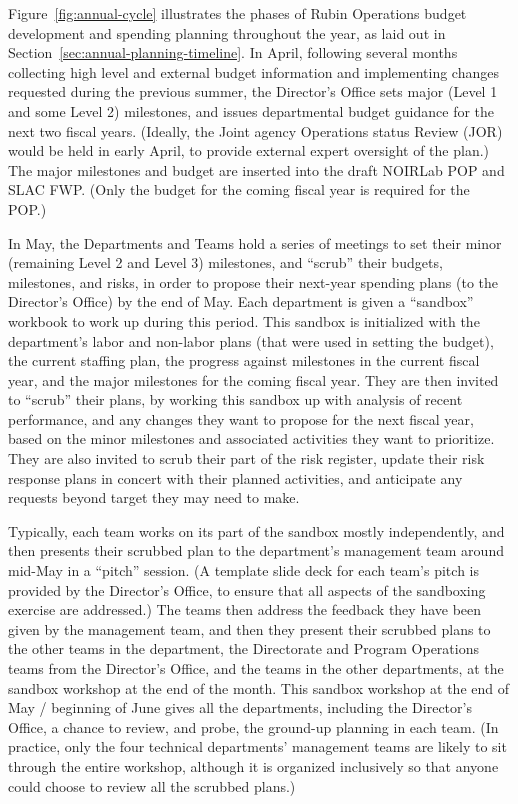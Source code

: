 Figure~\ref{fig:annual-cycle} illustrates the phases of \gls{Rubin Operations} budget development and spending planning throughout the year, as laid out in Section~\ref{sec:annual-planning-timeline}.
In April, following several months collecting high level and external budget information and implementing changes requested during the previous summer, the \gls{Director}'s Office sets major (Level 1 and some Level 2) milestones, and issues departmental budget guidance for the next two fiscal years.
(Ideally, the Joint agency \gls{Operations} status \gls{Review} (\gls{JOR}) would be held in early April, to provide external expert oversight of the plan.)
The major milestones and budget are inserted into the draft \gls{NOIRLab} \gls{POP} and \gls{SLAC} FWP.
(Only the budget for the coming fiscal year is required for the \gls{POP}.)

In May, the Departments and Teams hold a series of meetings to set their minor (remaining Level 2 and Level 3) milestones, and ``scrub'' their budgets, milestones, and risks, in order to propose their next-year spending plans (to the \gls{Director}'s Office) by the end of May.
Each department is given a ``sandbox'' workbook to work up during this period.
This sandbox is initialized with the department's labor and non-labor plans (that were used in setting the budget), the current staffing plan, the progress against milestones in the current fiscal year, and the major milestones for the coming fiscal year.
They are then invited to ``scrub'' their plans, by working this sandbox up with analysis of recent performance, and any changes they want to propose for the next fiscal year, based on the minor milestones and associated activities they want to prioritize.
They are also invited to scrub their part of the risk register, update their risk response plans in concert with their planned activities, and anticipate any requests beyond target they may need to make.

Typically, each team works on its part of the sandbox mostly independently, and then presents their scrubbed plan to the department's management team around mid-May in a ``pitch'' session.
(A template slide deck for each team's pitch is provided by the \gls{Director}'s Office, to ensure that all aspects of the sandboxing exercise are addressed.)
The teams then address the feedback they have been given by the management team, and then they present their scrubbed plans to the other teams in the department, the Directorate and Program \gls{Operations} teams from the \gls{Director}'s Office, and the teams in the other departments, at the sandbox workshop at the end of the month.
This sandbox workshop at the end of May / beginning of June gives all the departments, including the \gls{Director}'s Office, a chance to review, and probe, the ground-up planning in each team.
(In practice, only the four technical departments' management teams are likely to sit through the entire workshop, although it is organized inclusively so that anyone could choose to review all the scrubbed plans.)

